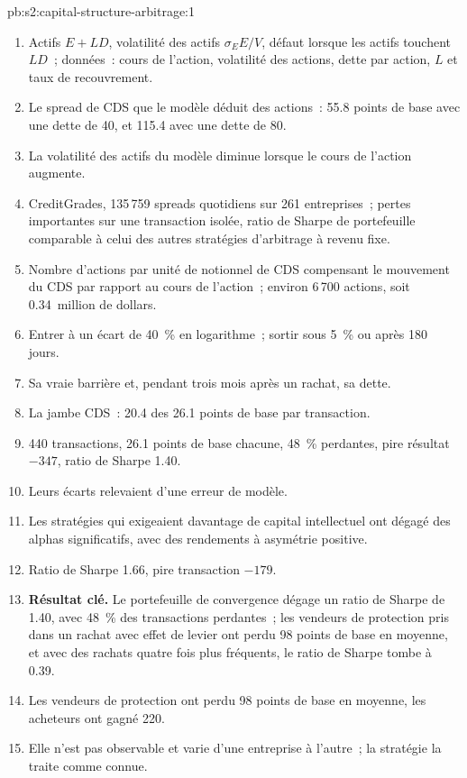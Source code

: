 \begin{solution}{pb:s2:capital-structure-arbitrage:1}
\begin{enumerate}
\item Actifs $E + LD$, volatilité des actifs $\sigma_E E/V$, défaut lorsque les actifs touchent $LD$~; données~: cours de l'action, volatilité des actions, dette par action, $L$ et taux de recouvrement.
\item Le spread de CDS que le modèle déduit des actions~: 55.8 points de base avec une dette de 40, et 115.4 avec une dette de 80.
\item La volatilité des actifs du modèle diminue lorsque le cours de l'action augmente.
\item CreditGrades, 135\,759 spreads quotidiens sur 261 entreprises~; pertes importantes sur une transaction isolée, ratio de Sharpe de portefeuille comparable à celui des autres stratégies d'arbitrage à revenu fixe.
\item Nombre d'actions par unité de notionnel de CDS compensant le mouvement du CDS par rapport au cours de l'action~; environ 6\,700 actions, soit 0.34~million de dollars.
\item Entrer à un écart de 40~\% en logarithme~; sortir sous 5~\% ou après 180 jours.
\item Sa vraie barrière et, pendant trois mois après un rachat, sa dette.
\item La jambe CDS~: 20.4 des 26.1 points de base par transaction.
\item 440 transactions, 26.1 points de base chacune, 48~\% perdantes, pire résultat $-347$, ratio de Sharpe 1.40.
\item Leurs écarts relevaient d'une erreur de modèle.
\item Les stratégies qui exigeaient davantage de capital intellectuel ont dégagé des alphas significatifs, avec des rendements à asymétrie positive.
\item Ratio de Sharpe 1.66, pire transaction $-179$.
\item \textbf{Résultat clé.} Le portefeuille de convergence dégage un ratio de Sharpe de 1.40, avec 48~\% des transactions perdantes~; les vendeurs de protection pris dans un
rachat avec effet de levier ont perdu 98 points de base en moyenne, et avec des rachats quatre fois plus fréquents, le ratio de Sharpe tombe à 0.39.
\item Les vendeurs de protection ont perdu 98 points de base en moyenne, les acheteurs ont gagné 220.
\item Elle n'est pas observable et varie d'une entreprise à l'autre~; la stratégie la traite comme connue.

\end{enumerate}
\end{solution}
